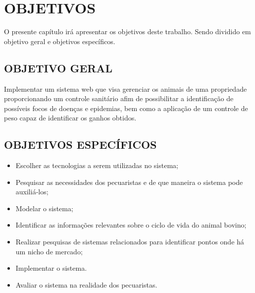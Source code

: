 %
%



\section{OBJETIVOS}

O presente capítulo irá apresentar os objetivos deste trabalho. Sendo dividido em objetivo geral e objetivos específicos.

\subsection{OBJETIVO GERAL}

Implementar um sistema web que visa gerenciar os animais de uma propriedade proporcionando um controle sanitário afim de possibilitar a identificação de possíveis focos de doenças e epidemias, bem como a aplicação de um controle de peso capaz de identificar os ganhos obtidos.

\subsection{OBJETIVOS ESPECÍFICOS}

\begin{itemize}
	\item Escolher as tecnologias a serem utilizadas no sistema;
	\item Pesquisar as necessidades dos pecuaristas e de que maneira o sistema pode auxiliá-los;
	\item Modelar o sistema;
	\item Identificar as informações relevantes sobre o ciclo de vida do animal bovino;
	\item Realizar pesquisas de sistemas relacionados para identificar pontos onde há um nicho de mercado;
	\item Implementar o sistema.
	\item Avaliar o sistema na realidade dos pecuaristas.
\end{itemize}

